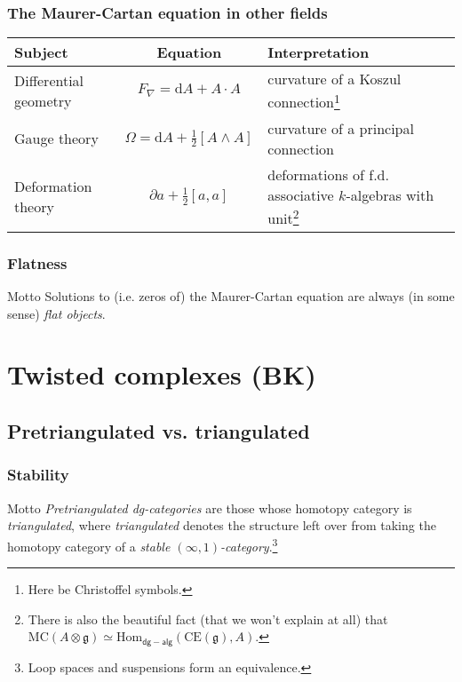 \documentclass{beamer}
\begin{document}
            \begin{frame}\frametitle{The Maurer-Cartan equation in other fields}
                \begin{table}
                    \begin{tabular}{p{1.8cm}cp{3.9cm}}\toprule
                        Subject & Equation & Interpretation\\\midrule
                        Differential geometry & $F_\nabla = \mathrm{d}A + A\cdot A$ & curvature of a Koszul connection\footnote{Here be Christoffel symbols.}\\[.5em]
                        Gauge theory & $\Omega = \mathrm{d}A + \frac12[A\wedge A]$ & curvature of a principal connection\\[.5em]
                        Deformation theory & $\partial a+\frac12[a,a]$ & deformations of f.d. associative $k$-algebras with unit\footnote{There is also the beautiful fact (that we won't explain at all) that $\mathrm{MC}(A\otimes\mathfrak{g}) \simeq \mathrm{Hom}_\mathsf{dg-alg}(\mathrm{CE}(\mathfrak{g}),A)$.}
                        \\\bottomrule
                    \end{tabular}
                \end{table}
            \end{frame}

            \begin{frame}\frametitle{Flatness}
                \begin{block}{Motto}
                    Solutions to (i.e. zeros of) the Maurer-Cartan equation are always (in some sense) \emph{flat objects}.
                \end{block}
            \end{frame}


    \section{Twisted complexes (BK)}
        
        \subsection{Pretriangulated vs. triangulated}

            \begin{frame}\frametitle{Stability}
                \begin{block}{Motto}
                    \emph{Pretriangulated dg-categories} are those whose homotopy category is \emph{triangulated}, where \emph{triangulated} denotes the structure left over from taking the homotopy category of a \emph{stable $(\infty,1)$-category}.\footnote{Loop spaces and suspensions form an equivalence.}
                \end{block}
            \end{frame}
\end{document}
